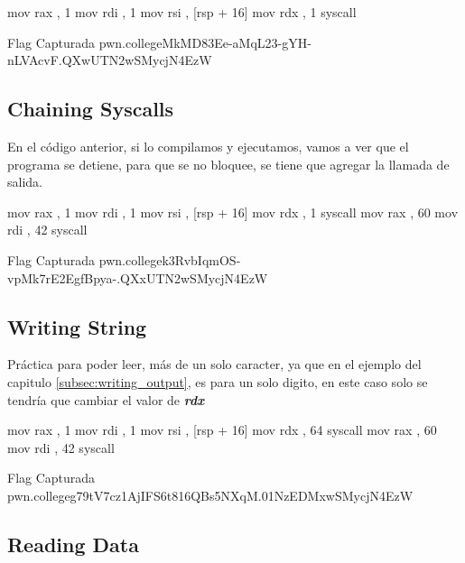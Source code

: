 \begin{codebox}[ASM]{}
	mov rax , 1
	mov rdi , 1
	mov rsi , [rsp + 16]
	mov rdx , 1
	syscall
\end{codebox}

\begin{flagbox}{Flag Capturada}
	pwn.college{MkMD83Ee-aMqL23-gYH-nLVAcvF.QXwUTN2wSMycjN4EzW}
\end{flagbox}

\subsection{Chaining Syscalls}\label{subsec:chaining_syscalls}


En el código anterior, si lo compilamos y ejecutamos, vamos a ver que el
programa se detiene, para que se no bloquee, se tiene que agregar la llamada
de salida.

\begin{codebox}[ASM]{}
	mov rax , 1
	mov rdi , 1
	mov rsi , [rsp + 16]
	mov rdx , 1
	syscall
	mov rax , 60
	mov rdi , 42
	syscall
\end{codebox}

\begin{flagbox}{Flag Capturada}
	pwn.college{k3RvbIqmOS-vpMk7rE2EgfBpya-.QXxUTN2wSMycjN4EzW}
\end{flagbox}

\subsection{Writing String}\label{subsec:writing_string}

Práctica para poder leer, más de un solo caracter, ya que en el ejemplo del
capitulo \ref{subsec:writing_output}, es para un solo digito, en este caso
solo se tendría que cambiar el valor de \textit{\textbf{rdx}}

\begin{codebox}[ASM]{}
	mov rax , 1
	mov rdi , 1
	mov rsi , [rsp + 16]
	mov rdx , 64
	syscall
	mov rax , 60
	mov rdi , 42
	syscall
\end{codebox}

\begin{flagbox}{Flag Capturada}
	pwn.college{g79tV7cz1AjIFS6t816QBs5NXqM.01NzEDMxwSMycjN4EzW}
\end{flagbox}

\subsection{Reading Data}\label{subsec:reading_data}

